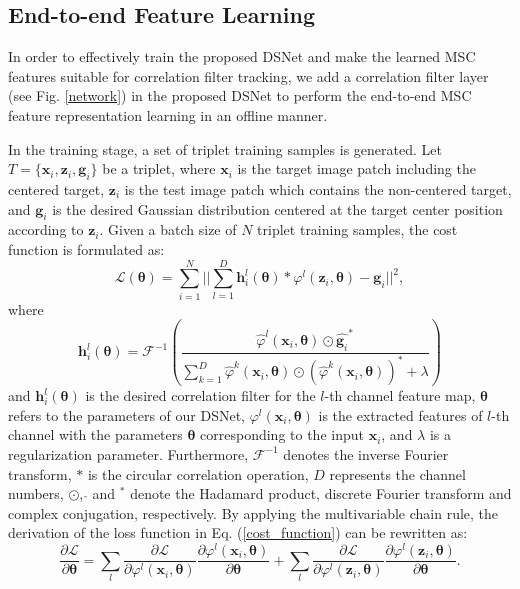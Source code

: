 \documentclass[runningheads]{llncs}
\begin{document}
\subsection{End-to-end Feature Learning}
In order to effectively train the proposed DSNet and make the learned MSC features suitable for correlation filter tracking, we add a correlation filter layer (see Fig. \ref{network}) in the proposed DSNet to perform the end-to-end MSC feature representation learning in an offline manner. 

In the training stage, a set of triplet training samples is generated. Let $T=\{\mathbf{x}_{i}, \mathbf{z}_{i}, \mathbf{g}_{i}\}$ be a triplet, where $\mathbf{x}_{i}$ is the target image patch including the centered target, $\mathbf{z}_{i}$ is the test image patch which contains the non-centered target, and $\mathbf{g}_{i}$ is the desired Gaussian distribution centered at the target center position according to $\mathbf{z}_{i}$. Given a  batch size of $N$ triplet training samples, the cost function is formulated as:
\begin{equation}\label{cost_function}
  \mathcal{L}(\mathbf{\theta}) = \sum_{i=1}^{N}{||\sum_{l=1}^{D}{\mathbf{h}_{i}^{l}(\mathbf{\theta})} \ast \varphi^{l}(\mathbf{z}_{i}, \mathbf{\theta})-\mathbf{g}_{i}||^2},
\end{equation}
where
\begin{equation}\label{cost_function2}
\mathbf{h}_{i}^{l}(\mathbf{\theta}) = \mathcal{F}^{-1}(\frac{\hat{\varphi}^{l}(\mathbf{x}_{i}, \mathbf{\theta}) \odot \hat{\mathbf{g}_{i}}^{\ast}}{\sum_{k=1}^{D}{\hat{\varphi}^{k}(\mathbf{x}_{i}, \mathbf{\theta}) \odot (\hat{\varphi}^{k}(\mathbf{x}_{i}, \mathbf{\theta}))^{\ast}+\lambda}})
\end{equation}
and $\mathbf{h}_{i}^{l}(\mathbf{\theta})$ is the desired correlation filter for the $l$-th channel feature map,  $\mathbf{\theta}$ refers to the parameters of our DSNet, $\varphi^{l}(\mathbf{x}_{i}, \mathbf{\theta})$ is the extracted features of $l$-th channel with the parameters $\mathbf{\theta}$ corresponding to the input $\mathbf{x}_{i}$, and $\lambda$ is a regularization parameter. Furthermore, $\mathcal{F}^{-1}$ denotes the inverse Fourier transform, $\ast$ is the circular correlation operation, $D$ represents the channel numbers, $\odot$, $\hat{}$ and ${}^{\ast}$ denote the Hadamard product, discrete Fourier transform and complex conjugation, respectively. By applying the multivariable chain rule, the derivation of the loss function in Eq. (\ref{cost_function}) can be rewritten as:
\begin{equation}\label{chain_loss}
   {\frac{\partial \mathcal{L}}{\partial \mathbf{\theta}} = \sum_{l}\frac{\partial \mathcal{L}}{\partial \varphi^{l}(\mathbf{x}_{i}, \mathbf{\theta})}\frac{\partial \varphi^{l}(\mathbf{x}_{i}, \mathbf{\theta})}{\partial \mathbf{\theta}} + \sum_{l}\frac{\partial \mathcal{L}}{\partial \varphi^{l}(\mathbf{z}_{i}, \mathbf{\theta})}\frac{\partial \varphi^{l}(\mathbf{z}_{i}, \mathbf{\theta})}{\partial \mathbf{\theta}}}.
\end{equation}
\end{document}
